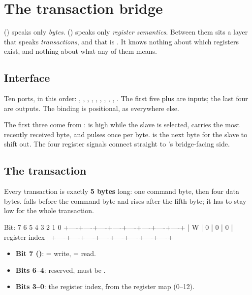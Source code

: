
\section{The transaction bridge }
\label{c19:sec:bridge}

 () speaks only \emph{bytes}. 
() speaks only \emph{register semantics}. Between them sits a layer that speaks
\emph{transactions}, and that is . It knows nothing about which registers exist,
and nothing about what any of them means.

\subsection*{Interface}
Ten ports, in this order: , , , ,
, , , , ,
. The first five plus  are inputs; the last four are outputs. The
binding is positional, as everywhere else.

The first three come from :  is high while the slave is selected,
 carries the most recently received byte, and  pulses once per byte.
 is the next byte for the slave to shift out. The four register signals connect straight
to 's bridge-facing side.

\subsection*{The transaction}
Every transaction is exactly \textbf{5 bytes} long: one command byte, then four data bytes. 
falls before the command byte and rises after the fifth byte; it has to stay low for the whole
transaction.

\begin{textdrawing}
Bit:      7    6    5    4    3    2    1    0
        +----+----+----+----+----+----+----+----+
        | W  | 0  | 0  | 0  |   register index  |
        +----+----+----+----+----+----+----+----+
\end{textdrawing}

\begin{itemize}
  \item \textbf{Bit 7 ()}:  = write,  = read.
  \item \textbf{Bits 6--4}: reserved, must be .
  \item \textbf{Bits 3--0}: the register index,  from the register map (0--12).
\end{itemize}


